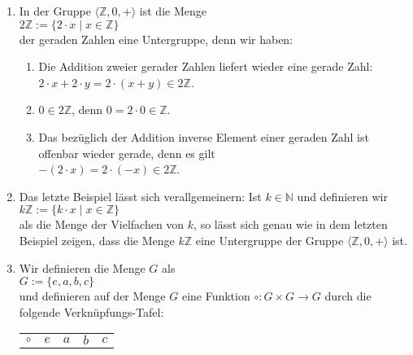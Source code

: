 \examples
\begin{enumerate}
\item In der Gruppe $\langle \mathbb{Z}, 0, + \rangle$ ist die Menge
      \\[0.2cm]
      \hspace*{1.3cm}
      $2 \mathbb{Z} := \{ 2 \cdot x \mid x \in \mathbb{Z} \}$
      \\[0.2cm]
      der geraden Zahlen eine Untergruppe, denn wir haben:
      \begin{enumerate}
      \item Die Addition zweier gerader Zahlen liefert wieder eine gerade Zahl:
            \\[0.2cm]
            \hspace*{1.3cm}
            $2 \cdot x + 2 \cdot y = 2 \cdot (x + y) \in 2 \mathbb{Z}$.
      \item $0 \in 2 \mathbb{Z}$, denn $0 = 2 \cdot 0 \in \mathbb{Z}$.
      \item Das bez\"{u}glich der Addition inverse Element einer geraden Zahl ist offenbar wieder gerade,
            denn es gilt
            \\[0.2cm]
            \hspace*{1.3cm}
            $- (2 \cdot x) = 2 \cdot (-x) \in 2 \mathbb{Z}$.
      \end{enumerate}
\item Das letzte Beispiel l\"{a}sst sich verallgemeinern: Ist $k \in \mathbb{N}$ und definieren wir
      \\[0.2cm]
      \hspace*{1.3cm}
      $k \mathbb{Z} := \{ k \cdot x \mid x \in \mathbb{Z} \}$
      \\[0.2cm]
      als die Menge der Vielfachen von $k$, so l\"{a}sst sich genau wie in dem letzten Beispiel zeigen, dass
      die Menge $k\mathbb{Z}$ eine Untergruppe der Gruppe $\langle \mathbb{Z}, 0, + \rangle$ ist.
\item Wir definieren die Menge $G$ als
      \\[0.2cm]
      \hspace*{1.3cm}
      $G := \{ e, a, b, c \}$
      \\[0.2cm]
      und definieren auf der Menge $G$ eine Funktion $\circ: G \times G \rightarrow G$ durch
      die folgende Verkn\"{u}pfungs-Tafel:
      \\[0.2cm]
      \hspace*{1.3cm}
      \begin{tabular}[t]{l|llll}
      $\circ$ & $e$ & $a$ & $b$ & $c$ \\

\end{tabular}
\end{enumerate}
